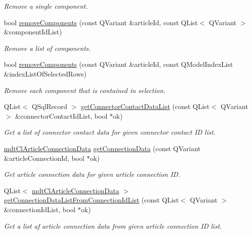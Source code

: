 \begin{DoxyCompactItemize}
\begin{DoxyCompactList}\small\item\em Remove a single component. \end{DoxyCompactList}\item 
bool \hyperlink{classmdt_cl_article_a95fb4303d579cc13e590de21f2ad7d52}{remove\-Components} (const Q\-Variant \&article\-Id, const Q\-List$<$ Q\-Variant $>$ \&component\-Id\-List)
\begin{DoxyCompactList}\small\item\em Remove a list of components. \end{DoxyCompactList}\item 
bool \hyperlink{classmdt_cl_article_a2b8c9c7dfa1061b729918432ae3ee006}{remove\-Components} (const Q\-Variant \&article\-Id, const Q\-Model\-Index\-List \&index\-List\-Of\-Selected\-Rows)
\begin{DoxyCompactList}\small\item\em Remove each component that is contained in selection. \end{DoxyCompactList}\item 
Q\-List$<$ Q\-Sql\-Record $>$ \hyperlink{classmdt_cl_article_ab2f39d61d3cb50c4bfe7805fd1611169}{get\-Connector\-Contact\-Data\-List} (const Q\-List$<$ Q\-Variant $>$ \&connector\-Contact\-Id\-List, bool $\ast$ok)
\begin{DoxyCompactList}\small\item\em Get a list of connector contact data for given connector contact I\-D list. \end{DoxyCompactList}\item 
\hyperlink{classmdt_cl_article_connection_data}{mdt\-Cl\-Article\-Connection\-Data} \hyperlink{classmdt_cl_article_a2c591965b47436ddf946c94bb7017dee}{get\-Connection\-Data} (const Q\-Variant \&article\-Connection\-Id, bool $\ast$ok)
\begin{DoxyCompactList}\small\item\em Get article connection data for given article connection I\-D. \end{DoxyCompactList}\item 
Q\-List$<$ \hyperlink{classmdt_cl_article_connection_data}{mdt\-Cl\-Article\-Connection\-Data} $>$ \hyperlink{classmdt_cl_article_a687fa2ef645c2345cf70e3435f8b34e8}{get\-Connection\-Data\-List\-From\-Connection\-Id\-List} (const Q\-List$<$ Q\-Variant $>$ \&connection\-Id\-List, bool $\ast$ok)
\begin{DoxyCompactList}\small\item\em Get a list af article connection data from given article connection I\-D list. \end{DoxyCompactList}\item 

\end{DoxyCompactItemize}

